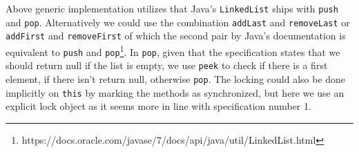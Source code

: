 \documentclass[a5paper]{article}
\begin{document}
Above generic implementation utilizes that Java's \texttt{LinkedList} ships with \texttt{push} and \texttt{pop}.
Alternatively we could use the combination \texttt{addLast} and \texttt{removeLast} or \texttt{addFirst} and \texttt{removeFirst} 
of which the second pair by Java's documentation is equivalent to \texttt{push} and \texttt{pop}\footnote{https://docs.oracle.com/javase/7/docs/api/java/util/LinkedList.html}. 
In \texttt{pop}, given that the specification states that we should return null if the list is empty, we use \texttt{peek} to check if there is a first element, if there isn't return null, otherwise \texttt{pop}.
The locking could also be done implicitly on \texttt{this} by marking the methods as synchronized, but here we use an explicit lock object as it seems more in line with specification number 1.
\end{document}
